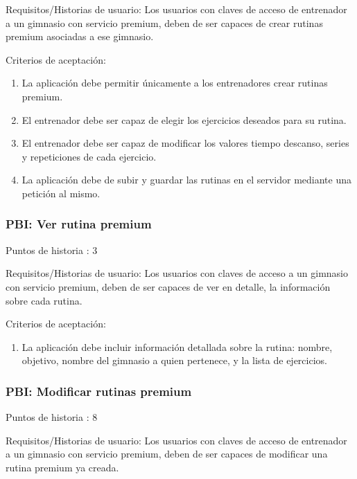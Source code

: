 \documentclass[11pt,a4paper]{report}
\begin{document}
Requisitos/Historias de usuario: Los usuarios con claves de acceso de entrenador a un gimnasio con servicio premium, deben de ser capaces de crear rutinas premium asociadas a ese gimnasio.

Criterios de aceptación:
\begin{enumerate}
	\item La aplicación debe permitir únicamente a los entrenadores crear rutinas premium.
	
	\item El entrenador debe ser capaz de elegir los ejercicios deseados para su rutina.
	
	\item El entrenador debe ser capaz de modificar los valores tiempo descanso, series y repeticiones de cada ejercicio.
	
	\item La aplicación debe de subir y guardar las rutinas en el servidor mediante una petición al mismo.
	
\end{enumerate}
\subsubsection{PBI: Ver rutina premium}
Puntos de historia : 3

Requisitos/Historias de usuario: Los usuarios con claves de acceso a un gimnasio con servicio premium, deben de ser capaces de ver en detalle, la información sobre cada rutina.

Criterios de aceptación:
\begin{enumerate}
	\item La aplicación debe incluir información detallada sobre la rutina: nombre, objetivo, nombre del gimnasio a quien pertenece, y la lista de ejercicios.
	
\end{enumerate}
\subsubsection{PBI: Modificar rutinas premium}

Puntos de historia : 8

Requisitos/Historias de usuario: Los usuarios con claves de acceso de entrenador a un gimnasio con servicio premium, deben de ser capaces de modificar una rutina premium ya creada.
\end{document}
